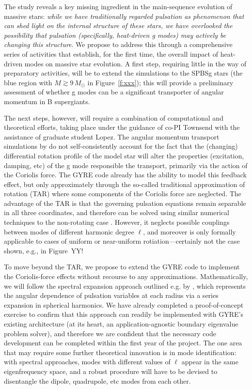 The \citet{Townsend:2017} study reveals a key missing ingredient in the main-sequence evolution of massive stars: \emph{while we have traditionally regarded pulsation as phenomenon that can shed light on the internal structure of these stars, we have overlooked the possibility that pulsation (specifically, heat-driven g modes) may actively be changing this structure}. We propose to address this through a comprehensive series of activities that establish, for the first time, the overall impact of heat-driven modes on massive star evolution. A first step, requiring little in the way of preparatory activities, will be to extend the \citet{Townsend:2017} simulations to the SPBSg stars (the blue region with $M \gtrsim 9\,M_{\odot}$ in Figure~\ref{f:xxx}); this will provide a preliminary assessment of whether g modes can be a significant transporter of angular momentum in B supergiants.

The next steps, however, will require a combination of computational and theoretical efforts, taking place under the guidance of co-PI Townsend with the assistance of graduate student Lopez. The angular momentum transport simulations by \citet{Townsend:2017} do not self-consistently account for the fact that the (changing) differential rotation profile of the model star will alter the properties (excitation, damping, etc) of the g mode responsible the transport, primarily via the action of the Coriolis force. The GYRE code already has the ability to model this feedback effect, but only approximately through the so-called traditional approximation of rotation (TAR) where some components of the Coriolis force are neglected. The advantage of the TAR is that the governing pulsation equations remain separable in all three coordinates, and therefore can be solved using similar numerical techniques to the non-rotating case \citep[see, e.g.,][for a demonstration of the TAR applied to rotating SPB stars]{Townsend:2005}. However, it neglects possible couplings between modes of different harmonic degree $\ell$, and moreover is only formally applicable to cases of uniform or near-uniform rotiation---certainly not the case shown, e.g., in Figure~YY!

To move beyond the TAR, we propose to extend the GYRE code to implement the Coriolis-force effects without recourse to any approximations. Mathematically, we will follow the spectral expansion approach outlined e.g. by \citep{Lee:2001}, which represents the angular dependence of pulsation variables at each radius via a series expansion in spherical harmonics. We have already completed a proof-of-concept exercise to confirm that this approach can readily be implemented with GYRE's existing architecture (at its heart, an application-agnostic boundary eigenvalue problem solver), and therefore we are confident that the necessary code development can be completed within the first year of the project. The one area that may require some further theoretical innovation is in mode identification: with spectral approaches, modes with different values of $\ell$ appear in the same eigenfrequency space, and a robust procedure will have to be devised to disentangle the dipole, quadrupole, etc modes from each other.

